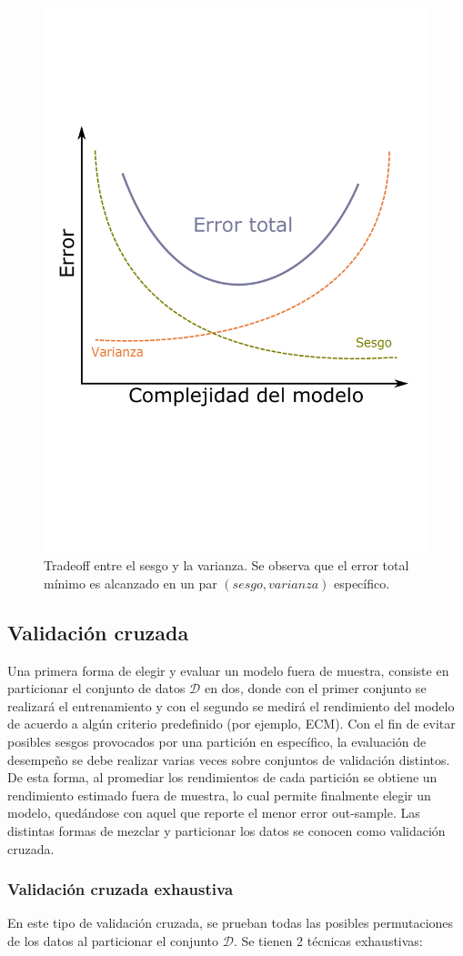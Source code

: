 \begin{figure}[h]
    \centering
    \includegraphics[width = 0.45\linewidth]{img/cap4_biasvariance.pdf}
    \caption{Tradeoff entre el sesgo y la varianza. Se observa que el error total mínimo es alcanzado en un par $(sesgo,varianza)$ específico.} 
\end{figure}


\subsection{Validación cruzada}

Una primera forma de elegir y evaluar un modelo fuera de muestra, consiste en particionar el conjunto de datos $\mathcal{D}$ en dos, donde con el primer conjunto se realizará el entrenamiento y con el segundo se medirá el rendimiento del modelo de acuerdo a algún criterio predefinido (por ejemplo, ECM). Con el fin de evitar posibles sesgos provocados por una partición en específico, la evaluación de desempeño se debe realizar varias veces sobre conjuntos de validación distintos. De esta forma, al promediar los rendimientos de cada partición se obtiene un rendimiento estimado fuera de muestra, lo cual permite finalmente elegir un modelo, quedándose con aquel que reporte el menor error out-sample. Las distintas formas de mezclar y particionar los datos se conocen como validación cruzada.

\subsubsection{Validación cruzada exhaustiva}

En este tipo de validación cruzada, se prueban todas las posibles permutaciones de los datos al particionar el conjunto $\mathcal{D}$. Se tienen 2 técnicas exhaustivas:

